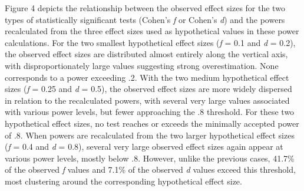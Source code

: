 \documentclass[authordate, meta, issue]{jote-new-article}
\begin{document}
	Figure 4 depicts the relationship between the observed effect sizes for the two types of statistically significant tests (Cohen's \emph{f} or Cohen's \emph{d}) and the powers recalculated from the three effect sizes used as hypothetical values in these power calculations. For the two smallest hypothetical effect sizes (\emph{f} = 0.1 and \emph{d} = 0.2), the observed effect sizes are distributed almost entirely along the vertical axis, with disproportionately large values suggesting strong overestimation. None corresponds to a power exceeding .2. With the two medium hypothetical effect sizes (\emph{f} = 0.25 and \emph{d} = 0.5), the observed effect sizes are more widely dispersed in relation to the recalculated powers, with several very large values associated with various power levels, but fewer approaching the .8 threshold. For these two hypothetical effect sizes, no test reaches or exceeds the minimally accepted power of .8. When powers are recalculated from the two larger hypothetical effect sizes (\emph{f} = 0.4 and \emph{d} = 0.8), several very large observed effect sizes again appear at various power levels, mostly below .8. However, unlike the previous cases, 41.7\% of the observed \emph{f} values and 7.1\% of the observed \emph{d} values exceed this threshold, most clustering around the corresponding hypothetical effect size.

	\newpage
\onecolumn
\end{document}
